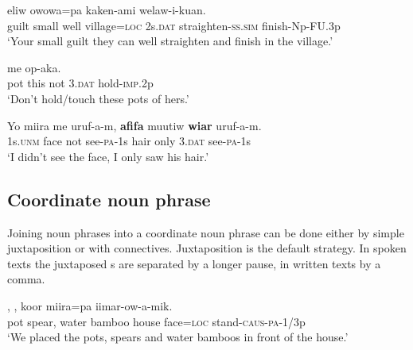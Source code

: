 \ea%
\label{ex:x1811}
\gll {}    eliw  owowa=pa    kaken-ami  welaw-i-kuan.\\
  guilt  small  well  village=\textsc{loc}  2s.\textsc{dat}  straighten-\textsc{ss}.\textsc{sim}  finish-Np-FU.3p    \\
\glt`Your small guilt they can well straighten and finish in the village.'
\z









\ea%
\label{ex:x1812}
\gll {}   me    op-aka. \\
 pot  this  not  3.\textsc{dat}  hold-\textsc{imp}.2p     \\
\glt`Don't hold/touch these pots of hers.'
\z





\ea%
\label{ex:x1938}
\gll Yo  miira  me  uruf-a-m,  \textbf{afifa}  muutiw  \textbf{wiar}  uruf-a-m. \\
   1s.\textsc{unm}  face  not  see-\textsc{pa}-1s  hair  only  3.\textsc{dat}  see-\textsc{pa}-1s   \\
\glt`I didn't see the face, I only saw his hair.'
\z





\subsection{Coordinate noun phrase}
{}
Joining noun phrases into a coordinate noun phrase can be done either by simple juxtaposition or with connectives. Juxtaposition is the default strategy.  In spoken texts the juxtaposed s are separated by a longer pause, in written texts by a comma.

\ea%
\label{ex:x810}
\gll {},  ,     koor  miira=pa  iimar-ow-a-mik. \\
  pot  spear,  water  bamboo  house  face=\textsc{loc}  stand-\textsc{caus}-\textsc{pa}-1/3p    \\
\glt`We placed the pots, spears and water bamboos in front of the house.'
\z





